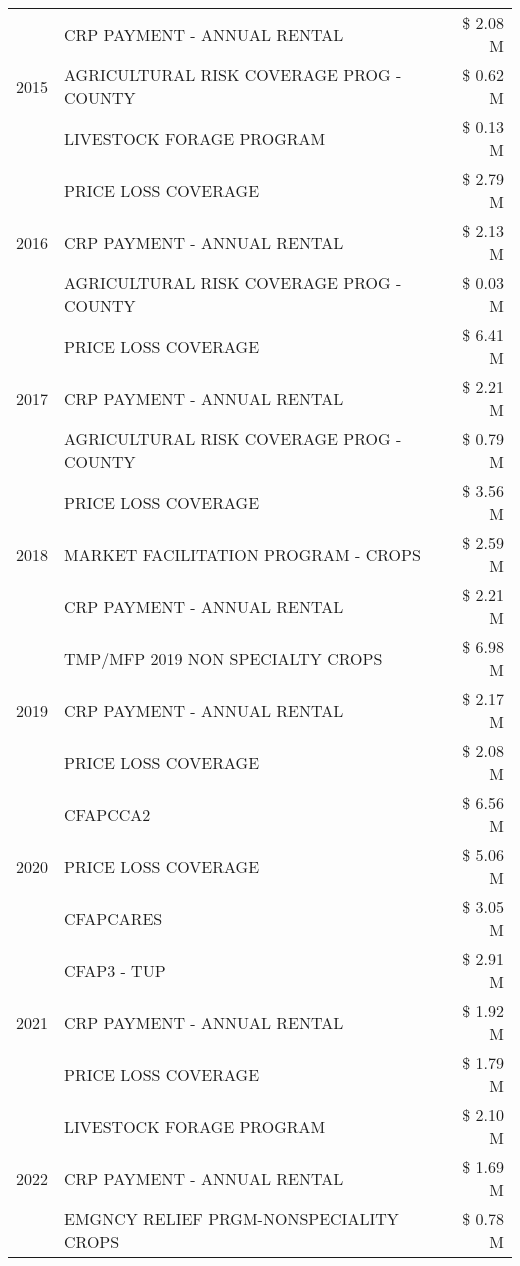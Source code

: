 \begin{tabular}{llr}
\multirow[t]{3}{*}{2015} & CRP PAYMENT - ANNUAL RENTAL & \$ 2.08 M \\
 & AGRICULTURAL RISK COVERAGE PROG - COUNTY & \$ 0.62 M \\
 & LIVESTOCK FORAGE PROGRAM & \$ 0.13 M \\
\cline{1-3}
\multirow[t]{3}{*}{2016} & PRICE LOSS COVERAGE & \$ 2.79 M \\
 & CRP PAYMENT - ANNUAL RENTAL & \$ 2.13 M \\
 & AGRICULTURAL RISK COVERAGE PROG - COUNTY & \$ 0.03 M \\
\cline{1-3}
\multirow[t]{3}{*}{2017} & PRICE LOSS COVERAGE & \$ 6.41 M \\
 & CRP PAYMENT - ANNUAL RENTAL & \$ 2.21 M \\
 & AGRICULTURAL RISK COVERAGE PROG - COUNTY & \$ 0.79 M \\
\cline{1-3}
\multirow[t]{3}{*}{2018} & PRICE LOSS COVERAGE & \$ 3.56 M \\
 & MARKET FACILITATION PROGRAM - CROPS & \$ 2.59 M \\
 & CRP PAYMENT - ANNUAL RENTAL & \$ 2.21 M \\
\cline{1-3}
\multirow[t]{3}{*}{2019} & TMP/MFP 2019 NON SPECIALTY CROPS & \$ 6.98 M \\
 & CRP PAYMENT - ANNUAL RENTAL & \$ 2.17 M \\
 & PRICE LOSS COVERAGE & \$ 2.08 M \\
\cline{1-3}
\multirow[t]{3}{*}{2020} & CFAPCCA2 & \$ 6.56 M \\
 & PRICE LOSS COVERAGE & \$ 5.06 M \\
 & CFAPCARES & \$ 3.05 M \\
\cline{1-3}
\multirow[t]{3}{*}{2021} & CFAP3 - TUP & \$ 2.91 M \\
 & CRP PAYMENT - ANNUAL RENTAL & \$ 1.92 M \\
 & PRICE LOSS COVERAGE & \$ 1.79 M \\
\cline{1-3}
\multirow[t]{3}{*}{2022} & LIVESTOCK FORAGE PROGRAM & \$ 2.10 M \\
 & CRP PAYMENT - ANNUAL RENTAL & \$ 1.69 M \\
 & EMGNCY RELIEF PRGM-NONSPECIALITY CROPS & \$ 0.78 M \\
\cline{1-3}
\bottomrule
\end{tabular}
